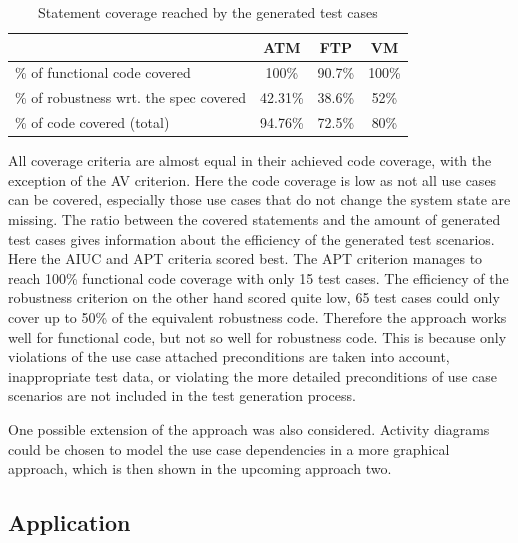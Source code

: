 \begin{table}[h]
	\centering
	\begin{small} 
	\caption{Statement coverage reached by the generated test cases}
	\label{codecoverage}
	\setlength{\tabcolsep}{1em}
		\begin{tabular}{l|c|c|c}
			\hline
			& \textbf{ATM} & \textbf{FTP} & \textbf{VM} \\
			\hline	
			\% of functional code covered & 100\% & 90.7\% & 100\% \\
			\hline
			\% of robustness wrt. the spec covered & 42.31\% & 38.6\% & 52\% \\
			\hline
			\% of code covered (total) & 94.76\% & 72.5\% & 80\% \\
			\hline
		\end{tabular}
	\end{small}
\end{table}

All coverage criteria are almost equal in their achieved code coverage, with the exception of the AV criterion. Here the code coverage is low as not all use cases can be covered, especially those use cases that do not change the system state are missing. The ratio between the covered statements and the amount of generated test cases gives information about the efficiency of the generated test scenarios. Here the AIUC and APT criteria scored best. The APT criterion manages to reach 100\% functional code coverage with only 15 test cases. The efficiency of the robustness criterion on the other hand scored quite low, 65 test cases could only cover up to 50\% of the equivalent robustness code. Therefore the approach works well for functional code, but not so well for robustness code. This is because only violations of the use case attached preconditions are taken into account, inappropriate test data, or violating the more detailed preconditions of use case scenarios are not included in the test generation process. 

One possible extension of the approach was also considered. Activity diagrams could be chosen to model the use case dependencies in a more graphical approach, which is then shown in the upcoming approach two. 

\subsection{Application}

